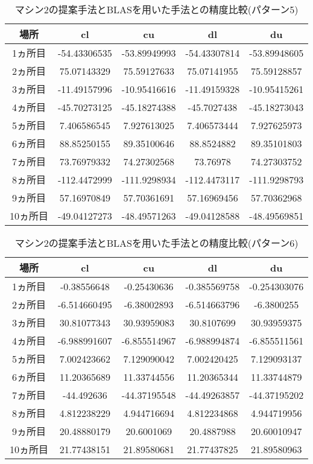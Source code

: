 \documentclass[11pt,a4paper]{jsreport}
\theoremstyle{definition}
\begin{document}
\begin{table}[H]
\centering
\begin{tabular}{|c|c|c|c|c|}
\hline
場所 & cl & cu & dl & du \\ \hline
1ヵ所目 & -54.43306535 & -53.89949993 & -54.43307814 & -53.89948605 \\ \hline
2ヵ所目 & 75.07143329 & 75.59127633 & 75.07141955 & 75.59128857 \\ \hline
3ヵ所目 & -11.49157996 & -10.95416616 & -11.49159328 & -10.95415261 \\ \hline
4ヵ所目 & -45.70273125 & -45.18274388 & -45.7027438 & -45.18273043 \\ \hline
5ヵ所目 & 7.406586545 & 7.927613025 & 7.406573444 & 7.927625973 \\ \hline
6ヵ所目 & 88.85250155 & 89.35100646 & 88.8524882 & 89.35101803 \\ \hline
7ヵ所目 & 73.76979332 & 74.27302568 & 73.76978 & 74.27303752 \\ \hline
8ヵ所目 & -112.4472999 & -111.9298934 & -112.4473117 & -111.9298793 \\ \hline
9ヵ所目 & 57.16970849 & 57.70361691 & 57.16969456 & 57.70362968 \\ \hline
10ヵ所目 & -49.04127273 & -48.49571263 & -49.04128588 & -48.49569851 \\ \hline
\end{tabular}
\caption{マシン2の提案手法とBLASを用いた手法との精度比較(パターン5)}
\end{table}

\begin{table}[H]
\centering
\begin{tabular}{|c|c|c|c|c|}
\hline
場所 & cl & cu & dl & du \\ \hline
1ヵ所目 & -0.38556648 & -0.25430636 & -0.385569758 & -0.254303076 \\ \hline
2ヵ所目 & -6.514660495 & -6.38002893 & -6.514663796 & -6.3800255 \\ \hline
3ヵ所目 & 30.81077343 & 30.93959083 & 30.8107699 & 30.93959375 \\ \hline
4ヵ所目 & -6.988991607 & -6.855514967 & -6.988994874 & -6.855511561 \\ \hline
5ヵ所目 & 7.002423662 & 7.129090042 & 7.002420425 & 7.129093137 \\ \hline
6ヵ所目 & 11.20365689 & 11.33744556 & 11.20365344 & 11.33744879 \\ \hline
7ヵ所目 & -44.492636 & -44.37195548 & -44.49263857 & -44.37195202 \\ \hline
8ヵ所目 & 4.812238229 & 4.944716694 & 4.812234868 & 4.944719956 \\ \hline
9ヵ所目 & 20.48880179 & 20.6001069 & 20.4887988 & 20.60010947 \\ \hline
10ヵ所目 & 21.77438151 & 21.89580681 & 21.77437825 & 21.89580963 \\ \hline
\end{tabular}
\caption{マシン2の提案手法とBLASを用いた手法との精度比較(パターン6)}
\end{table}
\end{document}
